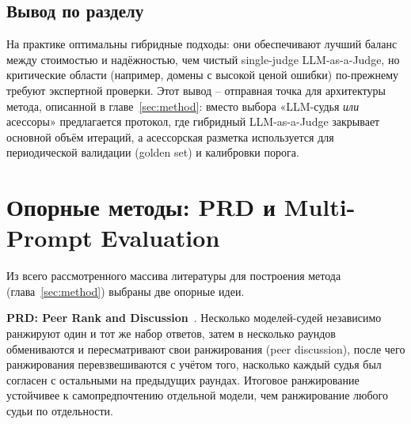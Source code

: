 \subsection{Вывод по разделу}

На практике оптимальны гибридные подходы: они обеспечивают лучший
баланс между стоимостью и надёжностью, чем чистый single-judge
LLM-as-a-Judge, но критические области (например, домены с высокой
ценой ошибки) по-прежнему требуют экспертной проверки.
Этот вывод -- отправная точка для архитектуры метода, описанной в
главе~\ref{sec:method}: вместо выбора «LLM-судья \emph{или} асессоры»
предлагается протокол, где гибридный LLM-as-a-Judge закрывает основной
объём итераций, а асессорская разметка используется для периодической
валидации (golden set) и калибровки порога.

\section{Опорные методы: PRD и Multi-Prompt Evaluation}
\label{sec:related:core-methods}

Из всего рассмотренного массива литературы для построения метода
(глава~\ref{sec:method}) выбраны две опорные идеи.

\textbf{PRD: Peer Rank and Discussion}~\cite{li2023prd}.
Несколько моделей-судей независимо ранжируют один и тот же набор
ответов, затем в несколько раундов обмениваются и пересматривают свои
ранжирования (peer discussion), после чего ранжирования
перевзвешиваются с учётом того, насколько каждый судья был согласен с
остальными на предыдущих раундах.
Итоговое ранжирование устойчивее к самопредпочтению отдельной модели,
чем ранжирование любого судьи по отдельности.

